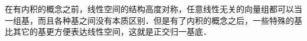 

在有内积的概念之前，线性空间的结构高度对称，任意线性无关的向量组都可以当一组基，而且各种基之间没有本质区别．但是有了内积的概念之后，一些特殊的基比其它的基更方便表达线性空间，这就是正交归一基底．


